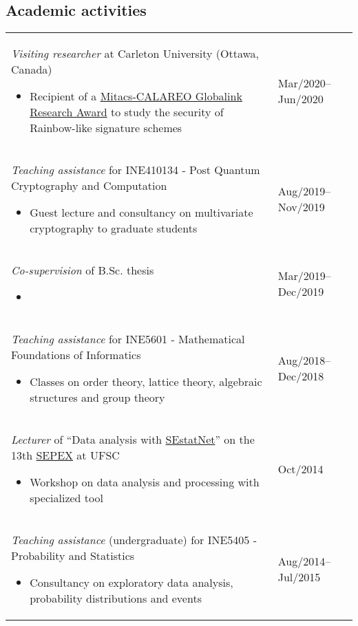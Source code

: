 \documentclass[12pt]{article}
\makeatletter
\newenvironment{datetable}
  {\newcolumntype{R}{>{\raggedleft\arraybackslash}p{0.14\textwidth}}
   \newcolumntype{L}{p{0.82\textwidth}}
   \begin{tabular}{@{\hspace{0mm}}LR}}
  {\end{tabular}}
\newenvironment{contenttable}[1]
  {\subsection*{#1}
   \begin{datetable}}
  {\end{datetable}}
\makeatother
\begin{document}
\begin{contenttable}{Academic activities}
  \emph{Visiting researcher} at Carleton University (Ottawa, Canada)
  \begin{itemize}
    \item Recipient of a \href{http://archive.is/RHxm4}{Mitacs-CALAREO
        Globalink Research Award} to study the security of Rainbow-like
          signature schemes
  \end{itemize} & Mar/2020--Jun/2020 \\

  \emph{Teaching assistance} for INE410134 - Post Quantum Cryptography and
    Computation
  \begin{itemize}
    \item Guest lecture and consultancy on multivariate cryptography to
        graduate students
  \end{itemize} & Aug/2019--Nov/2019 \\

  \emph{Co-supervision} of B.Sc. thesis
  \begin{itemize}
    \item {}
  \end{itemize} & Mar/2019--Dec/2019 \\

  \emph{Teaching assistance} for INE5601 - Mathematical Foundations of
    Informatics
  \begin{itemize}
    \item Classes on order theory, lattice theory, algebraic structures and
        group theory
  \end{itemize} & Aug/2018--Dec/2018 \\

  \emph{Lecturer} of ``Data analysis with
    \href{http://sestatnet.ufsc.br}{SEstatNet}'' on the 13th
    \href{https://sepex.ufsc.br/}{SEPEX} at UFSC
  \begin{itemize}
    \item Workshop on data analysis and processing with specialized tool
  \end{itemize} & Oct/2014 \\

  \emph{Teaching assistance} (undergraduate) for INE5405 - Probability and
    Statistics
  \begin{itemize}
    \item Consultancy on exploratory data analysis, probability distributions
        and events
  \end{itemize} & Aug/2014--Jul/2015 \\
\end{contenttable}
\end{document}

